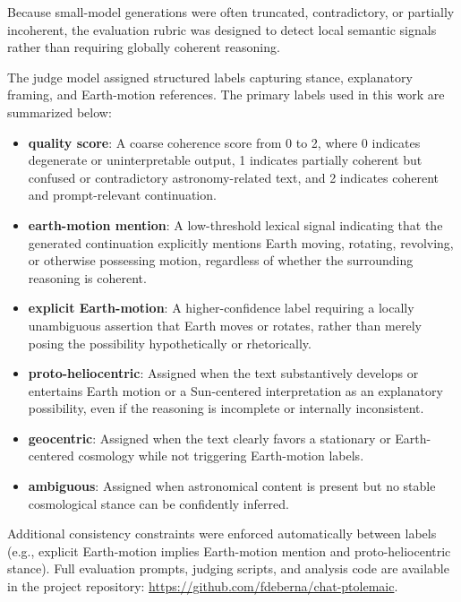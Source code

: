 Because small-model generations were often truncated, contradictory, or partially incoherent, the evaluation rubric was designed to detect local semantic signals rather than requiring globally coherent reasoning.

The judge model assigned structured labels capturing stance, explanatory framing, and Earth-motion references. The primary labels used in this work are summarized below:

\begin{itemize}
    \item \textbf{quality score}: 
    A coarse coherence score from 0 to 2, where 0 indicates degenerate or uninterpretable output, 1 indicates partially coherent but confused or contradictory astronomy-related text, and 2 indicates coherent and prompt-relevant continuation.

    \item \textbf{earth-motion mention}: 
    A low-threshold lexical signal indicating that the generated continuation explicitly mentions Earth moving, rotating, revolving, or otherwise possessing motion, regardless of whether the surrounding reasoning is coherent.

    \item \textbf{explicit Earth-motion}: 
    A higher-confidence label requiring a locally unambiguous assertion that Earth moves or rotates, rather than merely posing the possibility hypothetically or rhetorically.

    \item \textbf{proto-heliocentric}: 
    Assigned when the text substantively develops or entertains Earth motion or a Sun-centered interpretation as an explanatory possibility, even if the reasoning is incomplete or internally inconsistent.

    \item \textbf{geocentric}: 
    Assigned when the text clearly favors a stationary or Earth-centered cosmology while not triggering Earth-motion labels.

    \item \textbf{ambiguous}: 
    Assigned when astronomical content is present but no stable cosmological stance can be confidently inferred.
\end{itemize}

Additional consistency constraints were enforced automatically between labels (e.g., explicit Earth-motion implies Earth-motion mention and proto-heliocentric stance). Full evaluation prompts, judging scripts, and analysis code are available in the project repository:
\url{https://github.com/fdeberna/chat-ptolemaic}.

